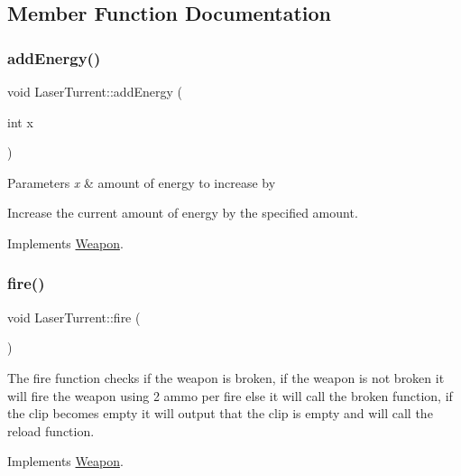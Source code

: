 \subsection{Member Function Documentation}
\mbox{\label{classLaserTurrent_a391a30b071f67e22a3b89800cafeb2ac}} 
\subsubsection{\texorpdfstring{add\+Energy()}{addEnergy()}}
{\footnotesize\ttfamily void Laser\+Turrent\+::add\+Energy (\begin{DoxyParamCaption}\item[{int}]{x }\end{DoxyParamCaption})\hspace{0.3cm}{\ttfamily [virtual]}}


\begin{DoxyParams}{Parameters}
{\em x} & amount of energy to increase by\\
\hline
\end{DoxyParams}
Increase the current amount of energy by the specified amount. 

Implements \hyperlink{classWeapon}{Weapon}.

\mbox{\label{classLaserTurrent_a227605641777e0db08eea85d1885f50d}} 
\subsubsection{\texorpdfstring{fire()}{fire()}}
{\footnotesize\ttfamily void Laser\+Turrent\+::fire (\begin{DoxyParamCaption}{ }\end{DoxyParamCaption})\hspace{0.3cm}{\ttfamily [virtual]}}

The fire function checks if the weapon is broken, if the weapon is not broken it will fire the weapon using 2 ammo per fire else it will call the broken function, if the clip becomes empty it will output that the clip is empty and will call the reload function. 

Implements \hyperlink{classWeapon}{Weapon}.

\mbox{\label{classLaserTurrent_a46a81e0670b7a095307f34032253ad2c}} 
